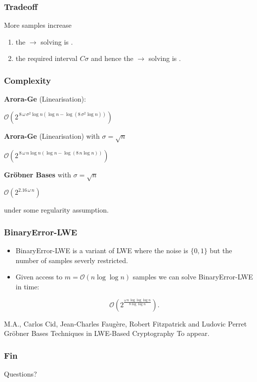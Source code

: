 \documentclass[10pt]{beamer}
\newcommand{\cemph}[1]{{\color{yellow9}{\bf #1}}\xspace}
\newcommand{\bigO}[1]{\ensuremath{\mathcal{O}\left(#1\right)}\xspace}
\begin{document}
\begin{frame}
\frametitle{Tradeoff}

More samples increase
\begin{enumerate}
  \item the \cemph{number of equations} $\rightarrow$ solving is \cemph{easier}.
  \item the required interval $C\sigma$ and hence the \cemph{degree} $\rightarrow$ solving is \cemph{harder}.
\end{enumerate}
\end{frame}

\begin{frame}
\frametitle{Complexity}

\textbf{Arora-Ge} (Linearisation):
\begin{center}
\Large $\bigO{2^{\,8\,\omega\,\sigma^2\log n( \log n - \log({8\, \sigma^2 \log n}))}}$
\end{center}
\phantom{under some regularity assumption.}

\textbf{Arora-Ge} (Linearisation) with $\sigma = \sqrt{n}$
\begin{center}
\Large $\bigO{2^{\,8\,\omega\,n\log n( \log n - \log({8\, n \log n}))}}$
\end{center}
\phantom{under some regularity assumption.}

\textbf{Gröbner Bases} with $\sigma = \sqrt{n}$
\begin{center}
\Large $\bigO{2^{2.16\,\omega\,n}}$
\end{center}
under some regularity assumption.
\end{frame}

\begin{frame}
\frametitle{BinaryError-LWE}

\begin{itemize}
  \item BinaryError-LWE is a variant of LWE where the noise is $\{0,1\}$ but the number of samples severly restricted.
  \item Given access to $m= \bigO{n \log\log n}$ samples we can solve BinaryError-LWE in \cemph{subexponential} time:

  {\Large $$\bigO{2^{\frac{\omega \, n \, \log \log \log n }{8 \log \log n}}}.$$}

\end{itemize}

\begin{thebibliography}{foobar}
M.A., Carlos Cid, Jean-Charles Faug\`ere, Robert Fitzpatrick and Ludovic Perret
\newblock Gr\"obner Bases Techniques in LWE-Based Cryptography
\newblock To appear.
\end{thebibliography}

\end{frame}



\begin{frame}
\frametitle{Fin}
\begin{center}
\large{Questions?}

\vspace{2em}

\end{center}
\end{frame}
\end{document}
